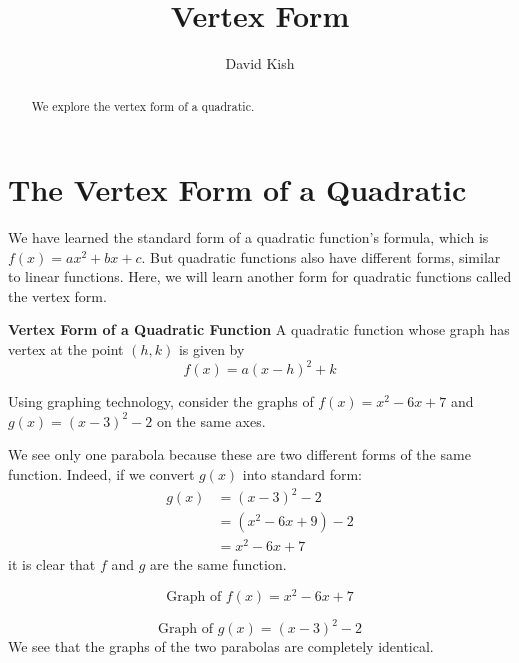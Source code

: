 \documentclass{ximera}
\author{David Kish}
\title{Vertex Form}
\begin{document}
\licenseY
\begin{abstract}
We explore the vertex form of a quadratic.
\end{abstract}
\maketitle


\section{The Vertex Form of a Quadratic}

      We have learned the standard form of a quadratic function's formula, which is $f(x)=ax^2+bx+c$.
      But quadratic functions also have different forms, similar to linear functions. Here, we will learn another form for quadratic functions called the vertex form.
\begin{callout} \textbf{\large{Vertex Form of a Quadratic Function}}
          A quadratic function whose graph has vertex at the point $(h,k)$ is given by
$$
f(x)=a(x-h)^2+k
$$
\end{callout}
    Using graphing technology, consider the graphs of $f(x)=x^2-6x+7$ and $g(x)=(x-3)^2-2$ on the same axes.

    We see only one parabola because these are two different forms of the same function.
    Indeed, if we convert $g(x)$ into standard form:
	\begin{align*}
		g(x)&=(x-3)^2-2\\
			&=(x^2-6x+9)-2\\
			&=x^2-6x+7
	\end{align*}
    it is clear that $f$ and $g$ are the same function.
 

    
    \begin{image}
    \end{image}
    $$ \text{Graph of } f(x)=x^2-6x+7 
    $$ 
    \begin{image}
    \end{image}
    $$\text{Graph of } g(x)=(x-3)^2-2 $$
    We see that the graphs of the two parabolas are completely identical.
\end{document}
